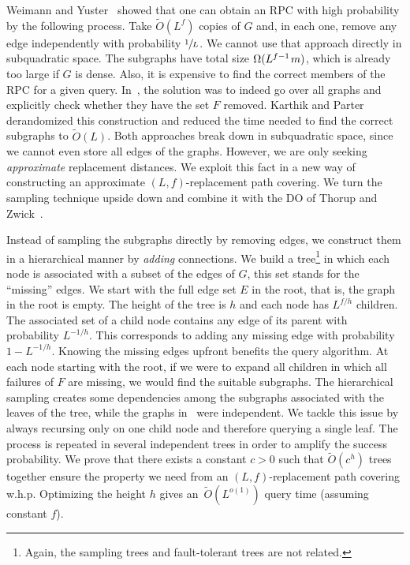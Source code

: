 \documentclass{article}\usepackage[a4paper,margin=20mm]{geometry}
\newcommand*{\Otilde}{\widetilde{O}}
\newcommand*{\nwspace}{\hspace*{.1em}}
\begin{document}
Weimann and Yuster~\cite{WY13} showed that one can obtain an RPC with high probability by the following process.
Take $\Otilde(L^f)$ copies of $G$ and,
in each one, remove any edge independently with probability $\sfrac{1}{L}$.
We cannot use that approach directly in subquadratic space.
The subgraphs have total size $\Omega(L^{f-1} \nwspace m)$, which is already too large if $G$ is dense.
Also, it is expensive to find the correct members of the RPC for a given query.
In~\cite{WY13}, the solution was to indeed go over all graphs and explicitly check
whether they have the set $F$ removed.
Karthik and Parter~\cite{KarthikParter21DeterministicRPC} derandomized this
construction and reduced the time needed to find the correct subgraphs to $\Otilde(L)$.
Both approaches break down in subquadratic space, since we cannot even store all edges of the graphs.
However, we are only seeking \emph{approximate} replacement distances.
We exploit this fact in a new way of constructing an approximate
$(L,f)$-replacement path covering.
We turn the sampling technique upside down
and combine it with the DO of Thorup and Zwick~\cite{ThorupZ05}.

Instead of sampling the subgraphs directly by removing edges,
we construct them in a hierarchical manner by \emph{adding} connections.
We build a tree\footnote{%
	Again, the sampling trees and fault-tolerant trees are not related.
} 
in which each node is associated with a subset of the edges of $G$,
this set stands for the ``missing'' edges.
We start with the full edge set $E$ in the root,
that is, the graph in the root is empty.
The height of the tree is $h$ and each node has $L^{f/h}$ children.
The associated set of a child node contains any edge of its parent with probability $L^{-1/h}$.
This corresponds to adding any missing edge with probability $1-L^{-1/h}$.
Knowing the missing edges upfront benefits the query algorithm.
At each node starting with the root, if we were to expand all children
in which all failures of $F$ are missing, we would find the suitable subgraphs.
The hierarchical sampling creates some dependencies among the subgraphs associated with 
the leaves of the tree, while the graphs in~\cite{WY13} were independent.
We tackle this issue by always recursing only on one child node
and therefore querying a single leaf.
The process is repeated in several independent trees in order to amplify the success probability.
We prove that there exists a constant $c > 0$ such that
$\Otilde(c^h)$ trees together ensure the property 
we need from an $(L,f)$-replacement path covering w.h.p.
Optimizing the height $h$ gives an~$\Otilde(L^{o(1)})$ query time (assuming constant $f$).
\end{document}
